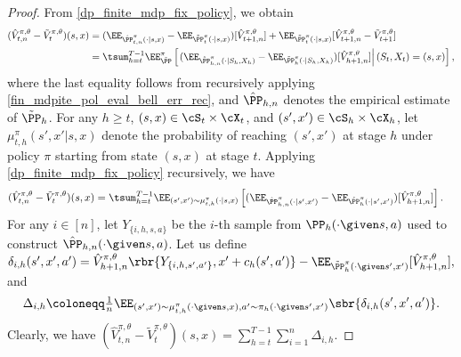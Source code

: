 \documentclass[9pt]{article}
\numberwithin{equation}{section}
\renewcommand{\frac}[2]{\tfrac{#1}{#2}}
\begin{document}
\begin{proof}
    From \eqref{dp_finite_mdp_fix_policy}, we obtain
    \begin{align}
        (\hat{V}_{t,n}^{\pi, \theta} - \tilde{V}_t^{\pi, \theta})(s,x) & = (\EE_{\hat{\PP}_{t,n}^\pi(\cdot|s,x)} - \EE_{\tilde{\PP}_t^\pi(\cdot|s,x)})[\hat{V}_{t+1,n}^{\pi, \theta}] + \EE_{\tilde{\PP}_t^\pi(\cdot|s,x)}[\hat{V}_{t+1,n}^{\pi, \theta} - \tilde{V}_{t+1}^{\pi, \theta}] \label{fin_mdpite_pol_eval_bell_err_rec}\\
        & = \tsum_{h=t}^{T-1} \EE_{\tilde \PP}^\pi \left[\left.(\EE_{\hat{\PP}_{h,n}^\pi(\cdot|S_h,X_h)} - \EE_{\tilde{\PP}_h^\pi(\cdot|S_h,X_h)})[\hat{V}_{h+1,n}^{\pi, \theta}]\right| (S_t, X_t) = (s,x)\right], \nonumber
    \end{align}
    where the last equality follows from recursively applying \eqref{fin_mdpite_pol_eval_bell_err_rec},
    and $\hat{\PP}_{h,n}$ denotes the empirical estimate of $\tilde{\PP}_h$.
    For any $h \geq t$,   $(s,x) \in \cS_t \times \cX_t$,
    and $(s', x') \in \cS_h \times \cX_h$,
    let   $\mu_{t,h}^\pi (s',x'|s,x)$ denote the probability of reaching $(s',x')$ at stage $h$ under policy $\pi$ starting  from state $(s,x)$ at stage $t$. 
    Applying \eqref{dp_finite_mdp_fix_policy} recursively, we have
    \begin{align}
        (\hat{V}_{t,n}^{\pi, \theta} - \tilde{V}_t^{\pi, \theta})(s,x) & = \tsum_{h=t}^{T-1} \EE_{(s',x') \sim \mu_{t,h}^{\pi}(\cdot|s,x)} \left[(\EE_{\hat{\PP}_{h,n}^\pi(\cdot|s',x')} - \EE_{\tilde{\PP}_h^\pi(\cdot|s',x')})[\hat{V}_{h+1,n}^{\pi, \theta}] \right]. \label{fin_mdp_pol_eval_err_sum_decom}  
    \end{align}    
For any $i \in [n]$, let $Y_{\{i,h,s,a\}}$ be the $i$-th sample from $\PP_h(\cdot\given s,a)$ used to construct $\hat{\PP}_{h,n}(\cdot\given s,a)$. 
Let us define 
$
\delta_{i, h}(s', x', a') = \hat V_{h+1,n}^{\pi,\theta}
    \rbr{Y_{\{i,h,s',a'\}},x'+c_h(s',a')}
    -
    \EE_{\tilde{\PP}_h^\pi(\cdot\given s',x')}
    [{\hat V_{h+1,n}^{\pi,\theta}}],
$
and
\begin{align*}
    \Delta_{i,h}
    \coloneqq
    \frac{1}{n}
    \EE_{{(s',x')\sim \mu_{t,h}^{\pi}(\cdot\given s,x) 
    , a'\sim \pi_h(\cdot\given s',x')}}
    \sbr{
   \delta_{i, h}(s', x', a')
    } .
\end{align*}
Clearly, we have $({\hat V_{t,n}^{\pi,\theta}-\tilde V_t^{\pi,\theta}})(s,x)
=\sum_{h=t}^{T-1}\sum_{i=1}^n\Delta_{i,h}$.

\end{proof}
\end{document}
